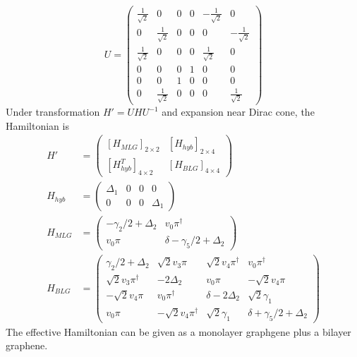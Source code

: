 \documentclass[12pt,a4paper]{article}
\begin{document}
    \[
        U = \begin{pmatrix}
        \frac{1}{\sqrt{2}}  & 0                     & 0     & 0     & -\frac{1}{\sqrt{2}}   & 0                     \\
        0                   & \frac{1}{\sqrt{2}}    & 0     & 0     & 0                     & -\frac{1}{\sqrt{2}}   \\
        \frac{1}{\sqrt{2}}  & 0                     & 0     & 0     & \frac{1}{\sqrt{2}}    & 0                     \\
        0                   & 0                     & 0     & 1     & 0                     & 0                     \\
        0                   & 0                     & 1     & 0     & 0                     & 0                     \\
        0                   & \frac{1}{\sqrt{2}}    & 0     & 0     & 0                     & \frac{1}{\sqrt{2}}
        \end{pmatrix}
    \]
    Under transformation $H' = U H U^{-1}$ and expansion near Dirac cone, the Hamiltonian is
    \begin{align}
        H' & = \begin{pmatrix}
            [H_{MLG}]_{2\times2} & [H_{hyb}]_{2\times4} \\
            [H_{hyb}^T]_{4\times2} & [H_{BLG}]_{4\times4}
        \end{pmatrix} \\[5pt]
        H_{hyb} &= \begin{pmatrix}
            \Delta_1    & 0     & 0     & 0         \\
            0           & 0     & 0     &\Delta_1
        \end{pmatrix} \\[5pt]
        H_{MLG} & = \begin{pmatrix}
            -\gamma_2/2+\Delta_2    & v_0\pi^\dagger      \\
            v_0\pi                  &\delta - \gamma_5/2+\Delta_2
        \end{pmatrix} \\[5pt]
        H_{BLG} & = \begin{pmatrix}
            \gamma_2/2+\Delta_2         & \sqrt{2}v_3\pi            & \sqrt{2}v_4\pi^\dagger  & v_0\pi^\dagger      \\
            \sqrt{2}v_3\pi^\dagger    & -2\Delta_2                & v_0\pi                    & -\sqrt{2}v_4\pi       \\
            -\sqrt{2}v_4\pi             & v_0\pi^\dagger          & \delta - 2\Delta_2        & \sqrt{2}\gamma_1      \\
            v_0\pi                      & -\sqrt{2}v_4\pi^\dagger & \sqrt{2}\gamma_1          & \delta+\gamma_5/2+\Delta_2
        \end{pmatrix}
    \end{align}
    The effective Hamiltonian can be given as a monolayer graphgene plus a bilayer graphene.
\end{document}
